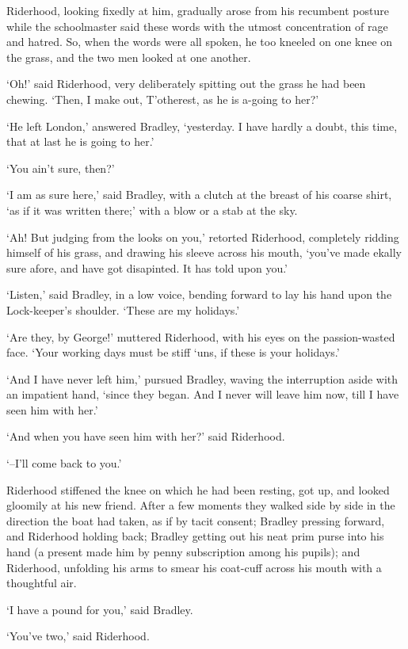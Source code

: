 Riderhood, looking fixedly at him, gradually arose from his recumbent
posture while the schoolmaster said these words with the utmost
concentration of rage and hatred. So, when the words were all spoken,
he too kneeled on one knee on the grass, and the two men looked at one
another.

‘Oh!’ said Riderhood, very deliberately spitting out the grass he had
been chewing. ‘Then, I make out, T’otherest, as he is a-going to her?’

‘He left London,’ answered Bradley, ‘yesterday. I have hardly a doubt,
this time, that at last he is going to her.’

‘You ain’t sure, then?’

‘I am as sure here,’ said Bradley, with a clutch at the breast of his
coarse shirt, ‘as if it was written there;’ with a blow or a stab at the
sky.

‘Ah! But judging from the looks on you,’ retorted Riderhood, completely
ridding himself of his grass, and drawing his sleeve across his mouth,
‘you’ve made ekally sure afore, and have got disapinted. It has told
upon you.’

‘Listen,’ said Bradley, in a low voice, bending forward to lay his hand
upon the Lock-keeper’s shoulder. ‘These are my holidays.’

‘Are they, by George!’ muttered Riderhood, with his eyes on the
passion-wasted face. ‘Your working days must be stiff ‘uns, if these is
your holidays.’

‘And I have never left him,’ pursued Bradley, waving the interruption
aside with an impatient hand, ‘since they began. And I never will leave
him now, till I have seen him with her.’

‘And when you have seen him with her?’ said Riderhood.

‘--I’ll come back to you.’

Riderhood stiffened the knee on which he had been resting, got up, and
looked gloomily at his new friend. After a few moments they walked side
by side in the direction the boat had taken, as if by tacit consent;
Bradley pressing forward, and Riderhood holding back; Bradley getting
out his neat prim purse into his hand (a present made him by penny
subscription among his pupils); and Riderhood, unfolding his arms to
smear his coat-cuff across his mouth with a thoughtful air.

‘I have a pound for you,’ said Bradley.

‘You’ve two,’ said Riderhood.

